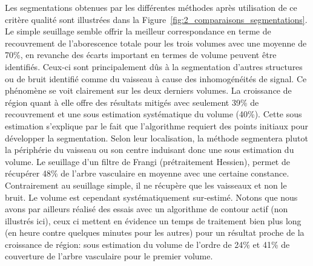 Les segmentations obtenues par les différentes méthodes après utilisation de ce critère qualité sont illustrées dans la Figure~\ref{fig:2_comparaisons_segmentations}. Le simple seuillage semble offrir la meilleur correspondance en terme de recouvrement de l'aborescence totale pour les trois volumes avec une moyenne de 70\%, en revanche des écarts important en termes de volume peuvent être identifiés. Ceux-ci sont principalement dûs à la segmentation d'autres structures ou de bruit identifié comme du vaisseau à cause des inhomogénéités de signal. Ce phénomène se voit clairement sur les deux derniers volumes. La croissance de région quant à elle offre des résultats mitigés avec seulement 39\% de recouvrement et une sous estimation systématique du volume (40\%). Cette sous estimation s'explique par le fait que l'algorithme requiert des points initiaux pour développer la segmentation. Selon leur localisation, la méthode segmentera plutot la périphérie du vaisseau ou son centre induisant donc une sous estimation du volume. Le seuillage d'un filtre de Frangi (prétraitement Hessien), permet de récupérer 48\%  de l'arbre vasculaire en moyenne avec une certaine constance. Contrairement au seuillage simple, il ne récupère que les vaisseaux et non le bruit. Le volume est cependant systématiquement sur-estimé. Notons que nous avons par ailleurs réalisé des essais avec un algorithme de contour actif (non illustrés ici), ceux ci mettent en évidence un temps de traitement bien plus long (en heure contre quelques minutes pour les autres) pour un résultat proche de la croissance de région: sous estimation du volume de l'ordre de 24\% et 41\% de couverture de l'arbre vasculaire pour le premier volume.\\

